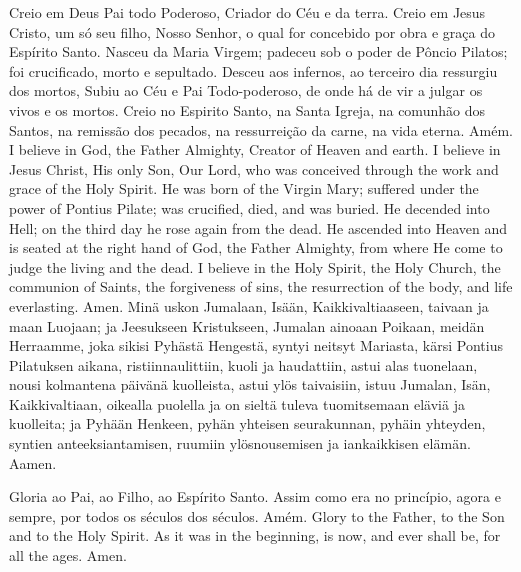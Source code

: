   \beginverse
    Creio em Deus Pai todo Poderoso,
    Criador do Céu e da terra.
    \parspace
    Creio em Jesus Cristo, um só seu filho,
    Nosso Senhor, o qual for concebido
    por obra e graça do Espírito Santo.
    Nasceu da Maria Virgem;
    padeceu sob o poder de Pôncio Pilatos;
    foi crucificado, morto e sepultado.
    Desceu aos infernos, ao terceiro dia
    ressurgiu dos mortos, Subiu ao Céu e
    Pai Todo-poderoso, de onde há de vir
    a julgar os vivos e os mortos.
    \parspace
    Creio no Espirito Santo, na Santa Igreja,
    na comunhão dos Santos, na remissão
    dos pecados, na ressurreição da carne,
    na vida eterna.
    \parspace
    Amém.
  \endverse
  \beginverse
    I believe in God, the Father Almighty,
    Creator of Heaven and earth.
    \parspace
    I believe in Jesus Christ, His only Son,
    Our Lord, who was conceived through
    the work and grace of the Holy Spirit.
    He was born of the Virgin Mary;
    suffered under the power of Pontius Pilate;
    was crucified, died, and was buried.
    He decended into Hell; on the third day
    he rose again from the dead.
    He ascended into Heaven and is
    seated at the right hand of God,
    the Father Almighty, from where He come
    to judge the living and the dead.
    \parspace
    I believe in the Holy Spirit, the Holy Church,
    the communion of Saints, the forgiveness of sins,
    the resurrection of the body, and life everlasting.
    \parspace
    Amen.
  \endverse
  \beginverse
    Minä uskon Jumalaan, Isään, Kaikkivaltiaaseen,
    taivaan ja maan Luojaan;
    \parspace
    ja Jeesukseen Kristukseen, Jumalan ainoaan Poikaan,
    meidän Herraamme, joka sikisi Pyhästä Hengestä,
    syntyi neitsyt Mariasta, kärsi Pontius Pilatuksen
    aikana, ristiinnaulittiin, kuoli ja haudattiin,
    astui alas tuonelaan, nousi kolmantena päivänä
    kuolleista, astui ylös taivaisiin, istuu Jumalan,
    Isän, Kaikkivaltiaan, oikealla puolella ja on sieltä
    tuleva tuomitsemaan eläviä ja kuolleita;
    \parspace
    ja Pyhään Henkeen, pyhän yhteisen seurakunnan,
    pyhäin yhteyden, syntien anteeksiantamisen,
    ruumiin ylösnousemisen ja iankaikkisen elämän.
    \parspace
    Aamen.
  \endverse
\endsong


  \beginverse
    \parspace
    Gloria ao Pai, ao Filho, ao Espírito Santo.
    Assim como era no princípio, agora e sempre,
    por todos os séculos dos séculos.
    \parspace
    Amém.
  \endverse
  \beginverse
    \parspace
    Glory to the Father, to the Son and to the Holy Spirit.
    As it was in the beginning, is now, and ever shall be,
    for all the ages.
    \parspace
    Amen.
  \endverse
\endsong


